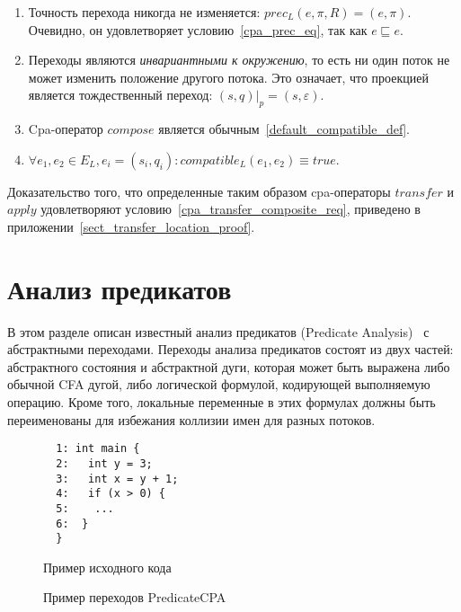 \begin{enumerate}
\item Точность перехода никогда не изменяется: $prec_L(e, \pi, R) = (e, \pi)$.
Очевидно, он удовлетворяет условию~\ref{cpa_prec_eq}, так как $e \sqsubseteq e$.

\item Переходы являются {\em инвариантными к окружению}, то есть ни один поток не может изменить положение другого потока.
Это означает, что проекцией является тождественный переход:
$(s, q)|_p = (s, \varepsilon)$.

\item Cpa-оператор $compose$ является обычным~\ref{default_compatible_def}.

\item $\forall e_1, e_2 \in E_L, e_i = (s_i, q_i):compatible_L(e_1,e_2) \equiv true$.

\end{enumerate}

Доказательство того, что определенные таким образом cpa-операторы $transfer$ и $apply$ удовлетворяют условию~\ref{cpa_transfer_composite_req}, приведено в приложении~\ref{sect_transfer_location_proof}. 



\section{Анализ предикатов}
\label{sect_predicate_analysis}

В этом разделе описан известный анализ предикатов (Predicate Analysis)~\cite{Beyer10} с абстрактными переходами.
Переходы анализа предикатов состоят из двух частей: абстрактного состояния и абстрактной дуги, которая может быть выражена либо обычной CFA дугой, либо логической формулой, кодирующей выполняемую операцию.
Кроме того, локальные переменные в этих формулах должны быть переименованы для избежания коллизии имен для разных потоков.

\begin{figure}[h]
\begin{minipage}[h]{0.3\textwidth}
\begin{verbatim}
  1: int main {
  2:   int y = 3;
  3:   int x = y + 1;
  4:   if (x > 0) {
  5:    ...
  6:  }
  }
\end{verbatim}
\caption{Пример исходного кода}
\label{PredicateCodeExample}
\end{minipage}
\hfill
\begin{minipage}{0.65\textwidth}
    \caption{Пример переходов PredicateCPA}
    \label{img:PredicateCPA}
\end{minipage}
\end{figure}

